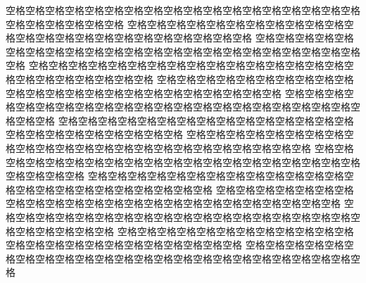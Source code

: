 \documentclass[UTF8]{ctexart}
\begin{document}
    空格\zs 空格\zs 空格\zs 空格\zs 空格\zs 空格\zs 空格\zs 空格\zs 空格\zs 空格\zs 空格\zs 空格\zs 空格\zs 空格\zs 空格\zs 空格\zs 空格\zs 空格\zs 空格\zs 空格\zs 空格\zs 空格\zs 空格\zs 空格
    空格\zs 空格\zs 空格\zs 空格\zs 空格\zs 空格\zs 空格\zs 空格\zs 空格\zs 空格\zs 空格\zs 空格\zs 空格\zs 空格\zs 空格\zs 空格\zs 空格\zs 空格\zs 空格\zs 空格\zs 空格\zs 空格\zs 空格\zs 空格
    空格\zs 空格\zs 空格\zs 空格\zs 空格\zs 空格\zs 空格\zs 空格\zs 空格\zs 空格\zs 空格\zs 空格\zs 空格\zs 空格\zs 空格\zs 空格\zs 空格\zs 空格\zs 空格\zs 空格\zs 空格\zs 空格\zs 空格\zs 空格
    空格\zs 空格\zs 空格\zs 空格\zs 空格\zs 空格\zs 空格\zs 空格\zs 空格\zs 空格\zs 空格\zs 空格\zs 空格\zs 空格\zs 空格\zs 空格\zs 空格\zs 空格\zs 空格\zs 空格\zs 空格\zs 空格\zs 空格\zs 空格
    空格\zs 空格\zs 空格\zs 空格\zs 空格\zs 空格\zs 空格\zs 空格\zs 空格\zs 空格\zs 空格\zs 空格\zs 空格\zs 空格\zs 空格\zs 空格\zs 空格\zs 空格\zs 空格\zs 空格\zs 空格\zs 空格\zs 空格\zs 空格
    空格\zs 空格\zs 空格\zs 空格\zs 空格\zs 空格\zs 空格\zs 空格\zs 空格\zs 空格\zs 空格\zs 空格\zs 空格\zs 空格\zs 空格\zs 空格\zs 空格\zs 空格\zs 空格\zs 空格\zs 空格\zs 空格\zs 空格\zs 空格
    空格\zs 空格\zs 空格\zs 空格\zs 空格\zs 空格\zs 空格\zs 空格\zs 空格\zs 空格\zs 空格\zs 空格\zs 空格\zs 空格\zs 空格\zs 空格\zs 空格\zs 空格\zs 空格\zs 空格\zs 空格\zs 空格\zs 空格\zs 空格
    空格\zs 空格\zs 空格\zs 空格\zs 空格\zs 空格\zs 空格\zs 空格\zs 空格\zs 空格\zs 空格\zs 空格\zs 空格\zs 空格\zs 空格\zs 空格\zs 空格\zs 空格\zs 空格\zs 空格\zs 空格\zs 空格\zs 空格\zs 空格
    空格\zs 空格\zs 空格\zs 空格\zs 空格\zs 空格\zs 空格\zs 空格\zs 空格\zs 空格\zs 空格\zs 空格\zs 空格\zs 空格\zs 空格\zs 空格\zs 空格\zs 空格\zs 空格\zs 空格\zs 空格\zs 空格\zs 空格\zs 空格
    空格\zs 空格\zs 空格\zs 空格\zs 空格\zs 空格\zs 空格\zs 空格\zs 空格\zs 空格\zs 空格\zs 空格\zs 空格\zs 空格\zs 空格\zs 空格\zs 空格\zs 空格\zs 空格\zs 空格\zs 空格\zs 空格\zs 空格\zs 空格
    空格\zs 空格\zs 空格\zs 空格\zs 空格\zs 空格\zs 空格\zs 空格\zs 空格\zs 空格\zs 空格\zs 空格\zs 空格\zs 空格\zs 空格\zs 空格\zs 空格\zs 空格\zs 空格\zs 空格\zs 空格\zs 空格\zs 空格\zs 空格
    空格\zs 空格\zs 空格\zs 空格\zs 空格\zs 空格\zs 空格\zs 空格\zs 空格\zs 空格\zs 空格\zs 空格\zs 空格\zs 空格\zs 空格\zs 空格\zs 空格\zs 空格\zs 空格\zs 空格\zs 空格\zs 空格\zs 空格\zs 空格
    空格\zs 空格\zs 空格\zs 空格\zs 空格\zs 空格\zs 空格\zs 空格\zs 空格\zs 空格\zs 空格\zs 空格\zs 空格\zs 空格\zs 空格\zs 空格\zs 空格\zs 空格\zs 空格\zs 空格\zs 空格\zs 空格\zs 空格\zs 空格
    空格\zs 空格\zs 空格\zs 空格\zs 空格\zs 空格\zs 空格\zs 空格\zs 空格\zs 空格\zs 空格\zs 空格\zs 空格\zs 空格\zs 空格\zs 空格\zs 空格\zs 空格\zs 空格\zs 空格\zs 空格\zs 空格\zs 空格\zs 空格
\end{document}
